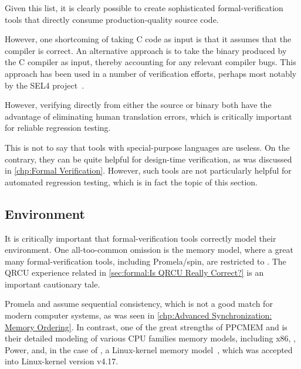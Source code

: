 Given this list, it is clearly possible to create sophisticated
formal-verification tools that directly consume production-quality
source code.

However, one shortcoming of taking C code as input is that it assumes
that the compiler is correct.
An alternative approach is to take the binary produced by the C compiler
as input, thereby accounting for any relevant compiler bugs.
This approach has been used in a number of verification efforts,
perhaps most notably by the SEL4
project~\cite{ThomasSewell2013L4binaryVerification}.

\QuickQuizEnd

However, verifying directly from either the source or binary both have the
advantage of eliminating human translation errors, which is critically
important for reliable regression testing.

This is not to say that tools with special-purpose languages are useless.
On the contrary, they can be quite helpful for design-time verification,
as was discussed in
\cref{chp:Formal Verification}.
However, such tools are not particularly helpful for automated regression
testing, which is in fact the topic of this section.

\subsection{Environment}
\label{sec:future:Environment}

It is critically important that formal-verification tools correctly
model their environment.
One all-too-common omission is the memory model, where a great
many formal-verification tools, including Promela/spin, are
restricted to .
The QRCU experience related in
\cref{sec:formal:Is QRCU Really Correct?}
is an important cautionary tale.

Promela and  assume sequential consistency, which is not a
good match for modern computer systems, as was seen in
\cref{chp:Advanced Synchronization: Memory Ordering}.
In contrast, one of the great strengths of PPCMEM and 
is their detailed modeling of various CPU families memory models,
including x86, \ARM, Power, and, in the case of ,
a Linux-kernel memory model~\cite{Alglave:2018:FSC:3173162.3177156},
which was accepted into Linux-kernel version v4.17.

